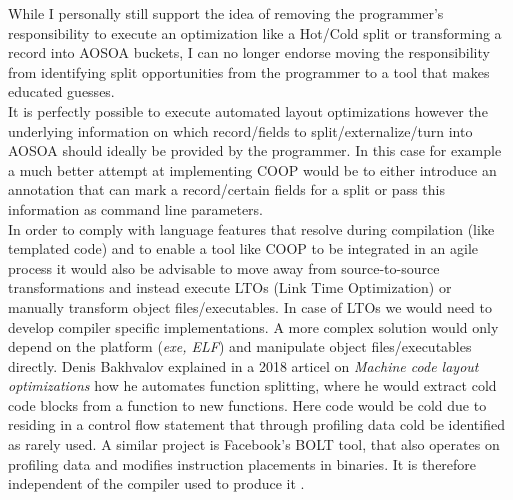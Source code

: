 While I personally still support the idea of removing the programmer's responsibility to execute an optimization like a Hot/Cold split or transforming a record into AOSOA buckets, I can no longer endorse moving the responsibility from identifying split opportunities from the programmer to a tool that makes educated guesses.\\
It is perfectly possible to execute automated layout optimizations however the underlying information on which record/fields to split/externalize/turn into AOSOA should ideally be provided by the programmer. In this case for example a much better attempt at implementing COOP would be to either introduce an annotation that can mark a record/certain fields for a split or pass this information as command line parameters.\\
In order to comply with language features that resolve during compilation (like templated code) and to enable a tool like COOP to be integrated in an agile process it would also be advisable to move away from source-to-source transformations and instead execute LTOs (Link Time Optimization) or manually transform object files/executables. In case of LTOs we would need to develop compiler specific implementations. A more complex solution would only depend on the platform (\textit{exe, ELF}) and manipulate object files/executables directly. Denis Bakhvalov explained in a 2018 articel on \textit{Machine code layout optimizations}  how he automates function splitting, where he would extract cold code blocks from a function to new functions. Here code would be cold due to residing in a control flow statement that through profiling data cold be identified as rarely used. A similar project is Facebook's BOLT tool, that also operates on profiling data and modifies instruction placements in binaries. It is therefore independent of the compiler used to produce it .
